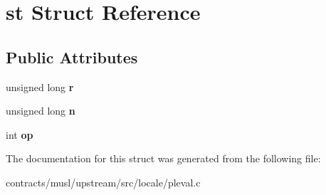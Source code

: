 \hypertarget{structst}{}\section{st Struct Reference}
\label{structst}
\subsection*{Public Attributes}
\begin{DoxyCompactItemize}
\item 
\mbox{\label{structst_a63aefd3710c4e2633a7aba7fac8b2879}} 
unsigned long {\bfseries r}
\item 
\mbox{\label{structst_a48d6614b4c9f72fd82ca8bfad7edfc08}} 
unsigned long {\bfseries n}
\item 
\mbox{\label{structst_ad4751f5fd33cf1f69e67332b2782de63}} 
int {\bfseries op}
\end{DoxyCompactItemize}


The documentation for this struct was generated from the following file\+:\begin{DoxyCompactItemize}
\item 
contracts/musl/upstream/src/locale/pleval.\+c\end{DoxyCompactItemize}

